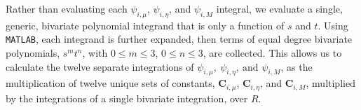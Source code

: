 \documentclass{mc2015}
\newcommand{\benum}{\begin{equation}} 			%
\newcommand{\eenum}{\end{equation}}
\newcommand{\beanum}{\begin{eqnarray}}  %
\newcommand{\eeanum}{\end{eqnarray}}
\newcommand{\eqts}[1]{Eqs. (\ref{#1})}  %
\newcommand{\B}[1]{\ensuremath{{B_{#1} }}}
\newcommand{\p}{\ensuremath{ \partial}}
\newcommand{\abs}[1]{\ensuremath{\left\lvert #1 \right\rvert}}
\newcommand{\BCSZ}{\ensuremath{\widetilde{\psi}_{BCSZ}}}
\newcommand{\BCSZH}{\ensuremath{\widehat{\psi}_{BCSZ}}}
\newcommand{\pec}{\, ,}
\newcommand{\pep}{\, .}
\begin{document}
Rather than evaluating each $\psi_{i,\mu}$, $\psi_{i,\eta}$, and $\psi_{i,M}$ integral, we evaluate a single, generic, bivariate polynomial integrand that is only a function of $s$ and $t$.
Using \verb+MATLAB+\cite{matlab},  each integrand is further expanded, then terms of equal degree bivariate polynomials,  $s^m t^n$,  with $0 \leq m \leq 3$, $0 \leq n \leq 3$, are collected.
This allows us to calculate the twelve separate integrations of  $\psi_{i,\mu},~\psi_{i,\eta},~\text{and }\psi_{i,M}$, as the multiplication of twelve unique sets of constants, $\mathbf{C}_{i,\mu}$, $\mathbf{C}_{i,\eta}$, and $\mathbf{C}_{i,M}$, multiplied  by the integrations of a single bivariate  integration, over $R$.
\end{document}
